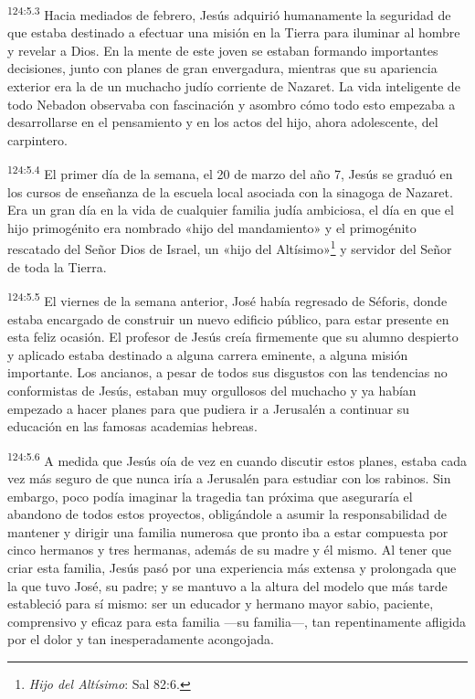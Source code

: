 \par
\textsuperscript{124:5.3} Hacia mediados de febrero, Jesús adquirió humanamente la seguridad de que estaba destinado a efectuar una misión en la Tierra para iluminar al hombre y revelar a Dios. En la mente de este joven se estaban formando importantes decisiones, junto con planes de gran envergadura, mientras que su apariencia exterior era la de un muchacho judío corriente de Nazaret. La vida inteligente de todo Nebadon observaba con fascinación y asombro cómo todo esto empezaba a desarrollarse en el pensamiento y en los actos del hijo, ahora adolescente, del carpintero.

\par
\textsuperscript{124:5.4} El primer día de la semana, el 20 de marzo del año 7, Jesús se graduó en los cursos de enseñanza de la escuela local asociada con la sinagoga de Nazaret. Era un gran día en la vida de cualquier familia judía ambiciosa, el día en que el hijo primogénito era nombrado «hijo del mandamiento» y el primogénito rescatado del Señor Dios de Israel, un «hijo del Altísimo»\footnote{\textit{Hijo del Altísimo}: Sal 82:6.} y servidor del Señor de toda la Tierra.

\par
\textsuperscript{124:5.5} El viernes de la semana anterior, José había regresado de Séforis, donde estaba encargado de construir un nuevo edificio público, para estar presente en esta feliz ocasión. El profesor de Jesús creía firmemente que su alumno despierto y aplicado estaba destinado a alguna carrera eminente, a alguna misión importante. Los ancianos, a pesar de todos sus disgustos con las tendencias no conformistas de Jesús, estaban muy orgullosos del muchacho y ya habían empezado a hacer planes para que pudiera ir a Jerusalén a continuar su educación en las famosas academias hebreas.

\par
\textsuperscript{124:5.6} A medida que Jesús oía de vez en cuando discutir estos planes, estaba cada vez más seguro de que nunca iría a Jerusalén para estudiar con los rabinos. Sin embargo, poco podía imaginar la tragedia tan próxima que aseguraría el abandono de todos estos proyectos, obligándole a asumir la responsabilidad de mantener y dirigir una familia numerosa que pronto iba a estar compuesta por cinco hermanos y tres hermanas, además de su madre y él mismo. Al tener que criar esta familia, Jesús pasó por una experiencia más extensa y prolongada que la que tuvo José, su padre; y se mantuvo a la altura del modelo que más tarde estableció para sí mismo: ser un educador y hermano mayor sabio, paciente, comprensivo y eficaz para esta familia ---su familia---, tan repentinamente afligida por el dolor y tan inesperadamente acongojada.

